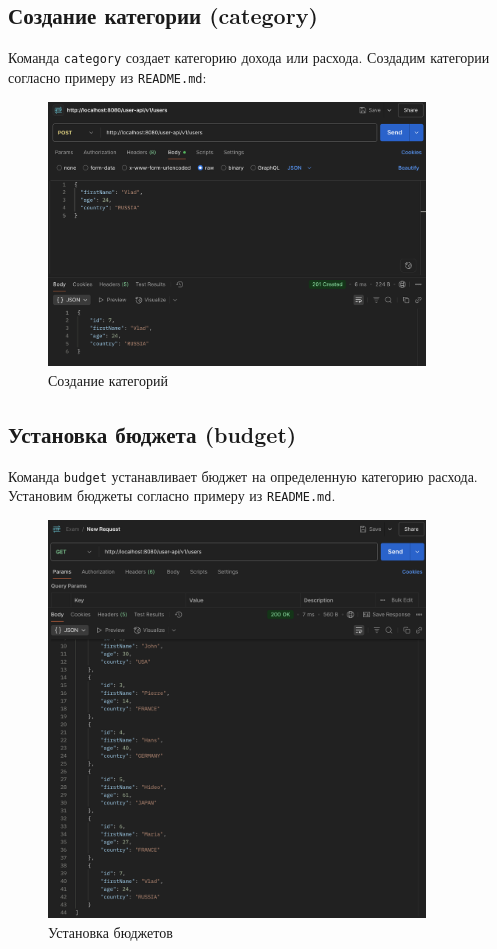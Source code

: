 \documentclass[a4paper, 14pt]{article}
\begin{document}
\subsection{Создание категории (category)}

Команда \texttt{category} создает категорию дохода или расхода. Создадим категории согласно примеру из \texttt{README.md}:

\begin{figure}[H]
	\centering
	\includegraphics[width=10cm]{resources/7.png}
	\caption{Создание категорий}
\end{figure}

\subsection{Установка бюджета (budget)}

Команда \texttt{budget} устанавливает бюджет на определенную категорию расхода. Установим бюджеты согласно примеру из \texttt{README.md}.

\begin{figure}[H]
	\centering
	\includegraphics[width=10cm]{resources/8.png}
	\caption{Установка бюджетов}
\end{figure}
\end{document}
